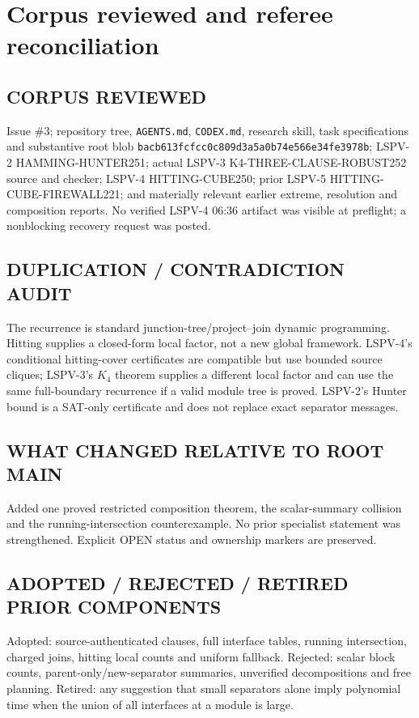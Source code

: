 \documentclass[11pt]{article}
\begin{document}
\section{Corpus reviewed and referee reconciliation}
\subsection*{CORPUS REVIEWED}
Issue \#3; repository tree, \texttt{AGENTS.md}, \texttt{CODEX.md}, research skill,
task specifications and substantive root blob
\texttt{bacb613fcfcc0c809d3a5a0b74e566e34fe3978b}; LSPV-2
HAMMING-HUNTER251; actual LSPV-3 K4-THREE-CLAUSE-ROBUST252 source and checker;
LSPV-4 HITTING-CUBE250; prior LSPV-5 HITTING-CUBE-FIREWALL221; and materially
relevant earlier extreme, resolution and composition reports.  No verified LSPV-4
06:36 artifact was visible at preflight; a nonblocking recovery request was posted.

\subsection*{DUPLICATION / CONTRADICTION AUDIT}
The recurrence is standard junction-tree/project--join dynamic programming.
Hitting supplies a closed-form local factor, not a new global framework.  LSPV-4's
conditional hitting-cover certificates are compatible but use bounded source
cliques; LSPV-3's $K_4$ theorem supplies a different local factor and can use the
same full-boundary recurrence if a valid module tree is proved.  LSPV-2's Hunter
bound is a SAT-only certificate and does not replace exact separator messages.

\subsection*{WHAT CHANGED RELATIVE TO ROOT MAIN}
Added one proved restricted composition theorem, the scalar-summary collision and
the running-intersection counterexample.  No prior specialist statement was
strengthened.  Explicit OPEN status and ownership markers are preserved.

\subsection*{ADOPTED / REJECTED / RETIRED PRIOR COMPONENTS}
Adopted: source-authenticated clauses, full interface tables, running intersection,
charged joins, hitting local counts and uniform fallback.  Rejected: scalar block
counts, parent-only/new-separator summaries, unverified decompositions and free
planning.  Retired: any suggestion that small separators alone imply polynomial
time when the union of all interfaces at a module is large.
\end{document}
